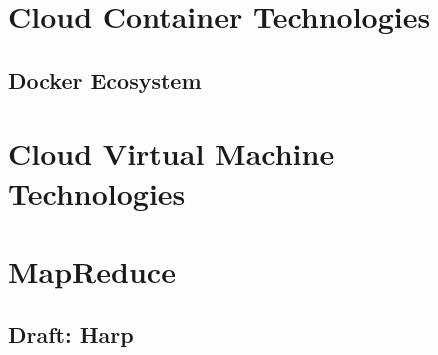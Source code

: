 \documentclass{format/laszewski}
\begin{document}
\part{Cloud Container Technologies}
\label{p:container}



















\chapter{Docker Ecosystem}




\part{Cloud Virtual Machine Technologies}





\part{MapReduce}
\label{p:mapreduce}








\chapter{Draft: Harp}
\label{c:harp}
\end{document}
